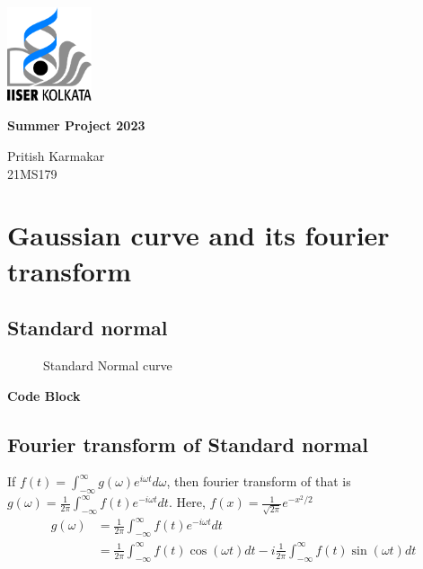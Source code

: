 \documentclass[11pt,a4paper]{article}
\author{Pritish Karmakar}
\begin{document}
	\begin{titlepage}
		\centering
		\includegraphics[width=2.5cm]{iiserk.png}
		
		\vspace{4cm}
		{\Huge\bfseries Summer Project 2023}
		
		\vspace{3cm}
		{\LARGE Pritish Karmakar\\}
		\vspace{0.3cm}
		{21MS179}
		\vfill
		
		
		\clearpage
		\tableofcontents
		\clearpage
		\listoffigures
		\listoftables
	\end{titlepage}
	
\section{Gaussian curve and its fourier transform}

\subsection{Standard normal}
	\begin{figure}[ht]
		\centering
		\scalebox{1.15}{}
		 \caption{Standard Normal curve}
		\label{fig:gaussian}
	\end{figure}


\noindent \dotfill \textbf{Code Block} \noindent\dotfill
%

\dotfill

\subsection{Fourier transform of Standard normal}
If $f(t)=\int_{-\infty}^{\infty}g(\omega)e^{i\omega t} d\omega$, then fourier transform of that is $g(\omega)=\frac{1}{2\pi}\int_{-\infty}^{\infty}f(t)e^{-i\omega t} dt$. Here, $f(x)=\frac{1}{\sqrt{2\pi}}e^{-x^2 /2}$\\

\begin{align*}
	g(\omega)&=\frac{1}{2\pi}\int_{-\infty}^{\infty}f(t)e^{-i\omega t} dt\\
	&=\frac{1}{2\pi}\int_{-\infty}^{\infty}f(t)\cos(\omega t) dt - i \frac{1}{2\pi}\int_{-\infty}^{\infty}f(t)\sin(\omega t) dt
\end{align*}
\end{document}
